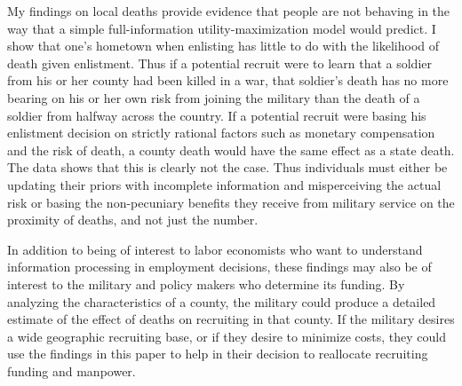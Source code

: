 \documentclass[12pt] {article}
\begin{document}
 

My findings on local deaths provide evidence that people
are not behaving in the way that a simple full-information utility-maximization
model would predict. I show that one's hometown when enlisting has
little to do with the likelihood of death given enlistment. Thus if
a potential recruit were to learn that a soldier from his or her
county had been killed in a war, that soldier's death has no more
bearing on his or her own risk from joining the military than the
death of a soldier from halfway across the country. If a potential
recruit were basing his enlistment decision on strictly rational factors such
as monetary compensation and the risk of death, a county death would
have the same effect as a state death. The data shows that this is
clearly not the case. Thus individuals must either be updating their
priors with incomplete information and misperceiving the actual risk
or basing the non-pecuniary benefits they receive from military service
on the proximity of deaths, and not just the number. 

In addition to being of interest to labor economists who want to understand information processing in employment decisions, these findings may also be of interest to the military and policy makers who determine its funding. By analyzing the characteristics
of a county, the military could produce a detailed estimate of the
effect of deaths on recruiting in that county. If the military desires
a wide geographic recruiting base, or if they desire to minimize costs,
they could use the findings in this paper to help in their decision
to reallocate recruiting funding and manpower. 



\end{document}
